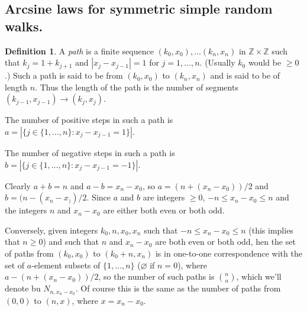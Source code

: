 \documentclass{article}
\newcommand{\Z}{\mathbb{Z}}
\theoremstyle{definition}
\newtheorem*{definition}{Definition}
\begin{document}
\subsection*{Arcsine laws for symmetric simple random walks.}
\begin{definition}
A \emph{path} is a finite sequence $(k_0, x_0), \dots (k_n, x_n)$ in $\Z \times \Z$ such that $k_j = 1 + k_{j+1}$ and $|x_j - x_{j-1}| = 1$ for $j = 1, \dots, n$. (Usually $k_0$ would be $\geq 0$.) Such a path is said to be from $(k_0, x_0)$ to $(k_n, x_n)$ and is said to be of length $n$. Thus the length of the path is the number of segments $(k_{j-1}, x_{j-1}) \to (k_j, x_j)$.

The number of positive steps in such a path is $a = |\{j \in \{1, \dots, n\} : x_j - x_{j-1} = 1\}|$.

The number of negative steps in such a path is $b = |\{j \in \{1, \dots, n\} : x_j - x_{j-1} = -1\}|$.

Clearly $a + b = n$ and $ a - b = x_n - x_0$, so $a = (n + (x_n-x_0))/2$ and $b = (n - (x_n - x_))/2$. Since $a$ and $b$ are integers $\geq 0$, $-n \leq x_n - x_0 \leq n$ and the integers $n$ and $x_n - x_0$ are either both even or both odd.

Conversely, given integers $k_0, n, x_0, x_n$ such that $-n \leq x_n - x_0 \leq n$ (this implies that $n \geq 0$) and such that $n$ and $x_n - x_0$ are both even or both odd, hen the set of paths from $(k_0, x_0)$ to $(k_0 + n, x_n)$ is in one-to-one correspondence with the set of $a$-element subsets of $\{1, \dots, n\}$ ($\varnothing$ if $n = 0$), where $a - (n+(x_n-x_0))/2$, so the number of such paths is $\binom{n}{a}$, which we'll denote bu $N_{n, x_n - x_0}$. Of course this is the same as the number of paths from $(0, 0)$ to $(n, x)$, where $x = x_n - x_0$.
\end{definition}
\end{document}
